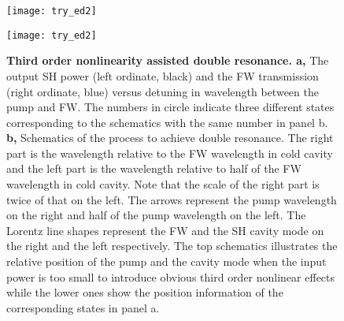 \begin{figure}
\centering
\texttt{[image: try\_ed2]}

\end{figure}
\begin{figure}
\texttt{[image: try\_ed2]}
\caption{\textbf{Third order nonlinearity assisted double resonance. a,} The output SH power (left ordinate, black) and the FW transmission (right ordinate, blue) versus detuning in wavelength between the pump and FW. The numbers in circle indicate three different states corresponding to the schematics with the same number in panel b. \textbf{b,} Schematics of the process to achieve double resonance. The right part is the wavelength relative to the FW wavelength in cold cavity and the left part is the wavelength relative to half of the FW wavelength in cold cavity. Note that the scale of the right part is twice of that on the left. The arrows represent the pump wavelength on the right and half of the pump wavelength on the left. The Lorentz line shapes represent the FW and the SH cavity mode on the right and the left respectively. The top schematics illustrates the relative position of the pump and the cavity mode when the input power is too small to introduce obvious third order nonlinear effects while the lower ones show the position information of the corresponding states in panel a.}
\label{pic:try_ed2}
\end{figure}

